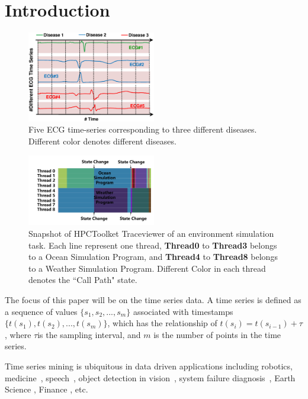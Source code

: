 \section{Introduction}
\label{sec:introduction}

\begin{figure}[t]
\centering
\includegraphics[width=0.5\textwidth]{ECGExp.eps}
\caption{ Five ECG time-series corresponding to three different diseases. Different color denotes different diseases.}
\label{fig:ecgexample}
\end{figure}

\begin{figure}[t]
\centering
\includegraphics[width=0.50\textwidth]{HPCExample.pdf}
\caption{Snapshot of HPCToolket Traceviewer of an environment simulation task.
Each line represent one thread, \textbf{Thread0} to \textbf{Thread3} belongs to a Ocean Simulation Program, and \textbf{Thread4} to \textbf{Thread8} belongs to a Weather Simulation Program. Different Color in each thread denotes the ``Call Path" state.}
\label{fig:hpcexample}
\end{figure}

The focus of this paper will be on the time series data. A time series is defined as a sequence of values $\{s_1,s_2,...,s_m\}$
associated with timestamps $\{t(s_1), t(s_2),..., t(s_m)\}$, which has the relationship of $t(s_i) = t(s_{i-1})+\tau$, where $\tau$is the sampling interval, and $m$ is the number of points in the time series.

Time series mining is ubiquitous in data driven applications including robotics, medicine~\cite{oates2000method,caracca2000discovering}, speech~\cite{rabiner1993fundamentals}, object detection in vision~\cite{yang2002detecting, sonka2014image}, system failure diagnosis~\cite{luo2014correlating,sun2014querying}, Earth Science \cite{mudelsee2013climate}, Finance \cite{granger2014forecasting}, etc.


